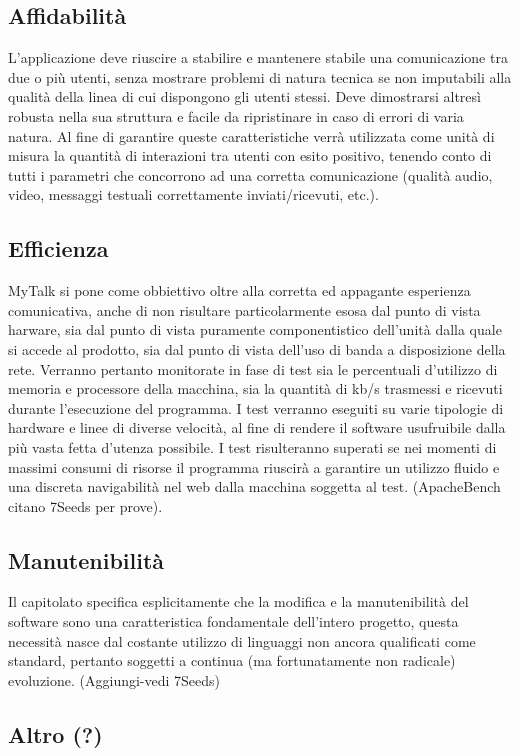 \subsection{Affidabilità}
L'applicazione deve riuscire a stabilire e mantenere stabile una comunicazione tra due o più utenti, senza mostrare problemi di natura tecnica se non imputabili alla qualità della linea di cui dispongono gli utenti stessi. Deve dimostrarsi altresì robusta nella sua struttura e facile da ripristinare in caso di errori di varia natura.
Al fine di garantire queste caratteristiche verrà utilizzata come unità di misura la quantità di interazioni tra utenti con esito positivo, tenendo conto di tutti i parametri che concorrono ad una corretta comunicazione (qualità audio, video, messaggi testuali correttamente inviati/ricevuti, etc.).
\subsection{Efficienza}
MyTalk si pone come obbiettivo oltre alla corretta ed appagante esperienza comunicativa, anche di non risultare particolarmente esosa dal punto di vista harware, sia dal punto di vista puramente componentistico dell'unità dalla quale si accede al prodotto, sia dal punto di vista dell'uso di banda a disposizione della rete.
Verranno pertanto monitorate in fase di test sia le percentuali d'utilizzo di memoria e processore della macchina, sia la quantità di kb/s trasmessi e ricevuti durante l'esecuzione del programma. I test verranno eseguiti su varie tipologie di hardware e linee di diverse velocità, al fine di rendere il software usufruibile dalla più vasta fetta d'utenza possibile.
I test risulteranno superati se nei momenti di massimi consumi di risorse il programma riuscirà a garantire un utilizzo fluido e una discreta navigabilità nel web dalla macchina soggetta al test. (ApacheBench citano 7Seeds per prove).

\subsection{Manutenibilità}
Il capitolato specifica esplicitamente che la modifica e la manutenibilità del software sono una caratteristica fondamentale dell'intero progetto, questa necessità nasce dal costante utilizzo di linguaggi non ancora qualificati come standard, pertanto soggetti a continua (ma fortunatamente non radicale) evoluzione.
(Aggiungi-vedi 7Seeds)
\subsection{Altro (?)}

